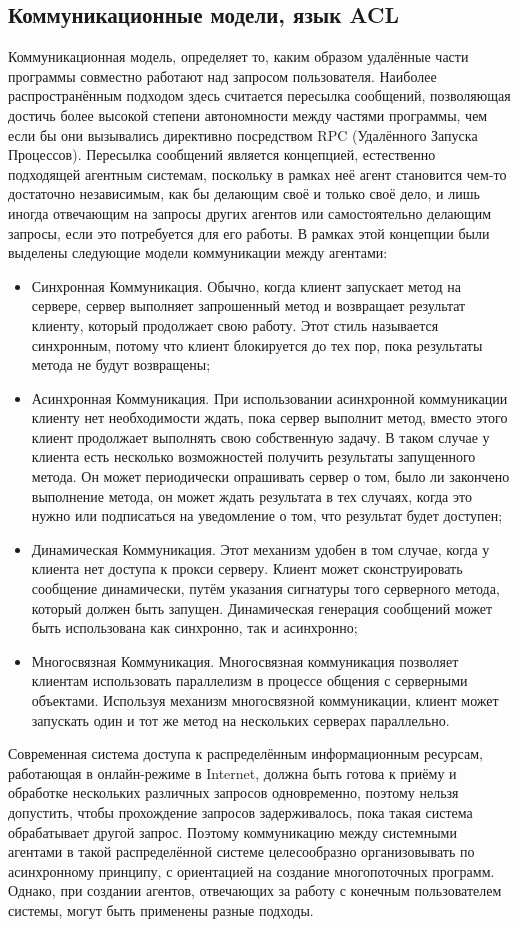 \subsection{Коммуникационные модели, язык ACL}
Коммуникационная модель, определяет то, каким образом удалённые части программы совместно работают над запросом пользователя. Наиболее распространённым подходом здесь считается пересылка сообщений, позволяющая достичь более высокой степени автономности между частями программы, чем если бы они вызывались директивно посредством RPC (Удалённого Запуска Процессов). Пересылка сообщений является концепцией, естественно подходящей агентным системам, поскольку в рамках неё агент становится чем-то достаточно независимым, как бы делающим своё и только своё дело, и лишь иногда отвечающим на запросы других агентов или самостоятельно делающим запросы, если это потребуется для его работы. В рамках этой концепции были выделены следующие модели коммуникации между агентами:
\begin{itemize}
\item Синхронная Коммуникация. Обычно, когда клиент запускает метод на сервере, сервер выполняет запрошенный метод и возвращает результат клиенту, который продолжает свою работу. Этот стиль называется синхронным, потому что клиент блокируется до тех пор, пока результаты метода не будут возвращены;
\item Асинхронная Коммуникация. При использовании асинхронной коммуникации клиенту нет необходимости ждать, пока сервер выполнит метод, вместо этого клиент продолжает выполнять свою собственную задачу. В таком случае у клиента есть несколько возможностей получить результаты запущенного метода. Он может периодически опрашивать сервер о том, было ли закончено выполнение метода, он может ждать результата в тех случаях, когда это нужно или подписаться на уведомление о том, что результат будет доступен;
\item Динамическая Коммуникация. Этот механизм удобен в том случае, когда у клиента нет доступа к прокси серверу. Клиент может сконструировать сообщение динамически, путём указания сигнатуры того серверного метода, который должен быть запущен. Динамическая генерация сообщений может быть использована как синхронно, так и асинхронно;
\item Многосвязная Коммуникация. Многосвязная коммуникация позволяет клиентам использовать параллелизм в процессе общения с серверными объектами. Используя механизм многосвязной коммуникации, клиент может запускать один и тот же метод на нескольких серверах параллельно.
\end{itemize}
Современная система доступа к распределённым информационным ресурсам, работающая в онлайн-режиме в Internet, должна быть готова к приёму и обработке нескольких различных запросов одновременно, поэтому нельзя допустить, чтобы прохождение запросов задерживалось, пока такая система обрабатывает другой запрос. Поэтому коммуникацию между системными агентами в такой распределённой системе целесообразно организовывать по асинхронному принципу, с ориентацией на создание многопоточных программ. Однако, при создании агентов, отвечающих за работу с конечным пользователем системы, могут быть применены разные подходы.

